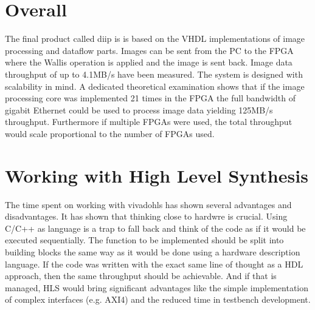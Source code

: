 %
%
\section{Overall}
The final product called \gls{diip} is is based on the VHDL implementations of
image processing and dataflow parts. Images can be sent from the PC to the FPGA
where
the Wallis operation is applied and the image is sent back. Image data
throughput of up to 4.1MB/s have been measured. The system is designed with
scalability in mind. A dedicated theoretical examination shows that if the
image processing core was implemented 21 times in the FPGA the full bandwidth of
gigabit Ethernet could be used to process image data yielding 125MB/s
throughput. Furthermore if multiple FPGAs were used, the total throughput would
scale proportional to the number of FPGAs used.

%
%
\section{Working with High Level Synthesis}
The time spent on working with \gls{vivadohls} has shown several advantages and
disadvantages. It has shown that thinking close to hardwre is crucial. Using
C/C++ as language is a trap to fall back and think of the code as if it would be
executed sequentially. The function to be implemented should be split into
building blocks the same way as it would be done using a hardware description
language. If the code was written with the exact same line of thought as a HDL
approach, then the same throughput should be achievable. And if that is managed,
HLS would bring significant advantages like the simple implementation of complex
interfaces (e.g. AXI4) and the reduced time in testbench development.

%
%
